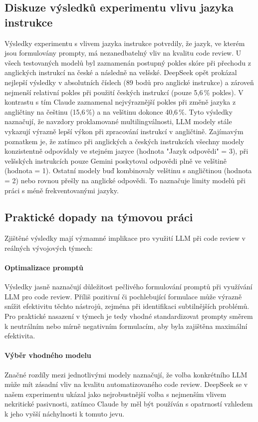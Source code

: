 \documentclass[12pt, a4paper]{article}
\begin{document}
\subsection{Diskuze výsledků experimentu vlivu jazyka instrukce}
Výsledky experimentu s vlivem jazyka instrukce potvrdily, že jazyk, ve kterém jsou formulovány prompty, má nezanedbatelný vliv na kvalitu code review. U všech testovaných modelů byl zaznamenán postupný pokles skóre při přechodu z anglických instrukcí na české a následně na velšské.
DeepSeek opět prokázal nejlepší výsledky v absolutních číslech (89 bodů pro anglické instrukce) a zároveň nejmenší relativní pokles při použití českých instrukcí (pouze 5,6\,\% pokles). V kontrastu s tím Claude zaznamenal nejvýraznější pokles při změně jazyka z angličtiny na češtinu (15,6\,\%) a na velštinu dokonce 40,6\,\%. Tyto výsledky naznačují, že navzdory proklamované multilingválnosti, LLM modely stále vykazují výrazně lepší výkon při zpracování instrukcí v angličtině.
Zajímavým poznatkem je, že zatímco při anglických a českých instrukcích všechny modely konzistentně odpovídaly ve stejném jazyce (hodnota "Jazyk odpovědi" = 3), při velšských instrukcích pouze Gemini poskytoval odpovědi plně ve velštině (hodnota = 1). Ostatní modely buď kombinovaly velštinu s angličtinou (hodnota = 2) nebo rovnou přešly na anglické odpovědi. To naznačuje limity modelů při práci s méně frekventovanými jazyky.

\subsection{Praktické dopady na týmovou práci}
Zjištěné výsledky mají významné implikace pro využití LLM při code review v reálných vývojových týmech:
\paragraph{Optimalizace promptů} Výsledky jasně naznačují důležitost pečlivého formulování promptů při využívání LLM pro code review. Příliš pozitivní či pochlebující formulace může výrazně snížit efektivitu těchto nástrojů, zejména při identifikaci subtilnějších problémů. Pro praktické nasazení v týmech je tedy vhodné standardizovat prompty směrem k neutrálním nebo mírně negativním formulacím, aby byla zajištěna maximální efektivita.
\paragraph{Výběr vhodného modelu} Značné rozdíly mezi jednotlivými modely naznačují, že volba konkrétního LLM může mít zásadní vliv na kvalitu automatizovaného code review. DeepSeek se v našem experimentu ukázal jako nejrobustnější volba s nejmenším vlivem nekritické pasivnosti, zatímco Claude by měl být používán s opatrností vzhledem k jeho vyšší náchylnosti k tomuto jevu.
\end{document}
